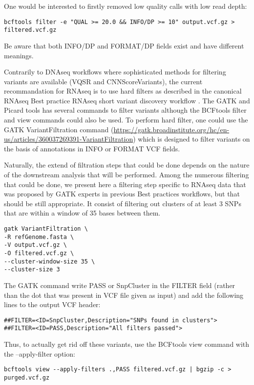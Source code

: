 One would be interested to firstly removed low quality calls with low read depth:

\begin{verbatim}
bcftools filter -e "QUAL >= 20.0 && INFO/DP >= 10" output.vcf.gz > filtered.vcf.gz
\end{verbatim}


Be aware that both INFO/DP and FORMAT/DP fields exist and have different meanings.


Contrarily to DNAseq workflows where sophisticated methods for filtering variants are available (VQSR and CNNScoreVariants), the current recommandation for RNAseq is to use hard filters as described in the canonical RNAseq Best practice RNAseq short variant discovery workflow \cite{GATK_RNAseq_variant_discovery}. The GATK and Picard tools has several commands to filter variants although the BCFtools filter and view commands could also be used. To perform hard filter, one could use the GATK VariantFiltration command  (\href{https://gatk.broadinstitute.org/hc/en-us/articles/360037269391-VariantFiltration}{https://gatk.broadinstitute.org/hc/en-us/articles/360037269391-VariantFiltration}) which is designed to filter variants on the basis of annotations in INFO or FORMAT VCF fields.

Naturally, the extend of filtration steps that could be done depends on the nature of the downstream analysis that will be performed. Among the numerous filtering that could be done, we present here a filtering step specific to RNAseq data that was proposed by GATK experts in previous Best practices workflows, but that should be still appropriate. It consist of filtering out clusters of at least 3 SNPs that are within a window of 35 bases between them.


\begin{verbatim}
gatk VariantFiltration \
-R refGenome.fasta \
-V output.vcf.gz \
-O filtered.vcf.gz \
--cluster-window-size 35 \
--cluster-size 3
\end{verbatim}

The GATK command write PASS or SnpCluster in the FILTER field (rather than the dot that was present in VCF file given as input) and add the following lines to the output VCF header:

\begin{verbatim}
##FILTER=<ID=SnpCluster,Description="SNPs found in clusters">
##FILTER=<ID=PASS,Description="All filters passed">
\end{verbatim}


Thus, to actually get rid off these variants, use the BCFtools view command with the --apply-filter option:
\begin{verbatim}
bcftools view --apply-filters .,PASS filtered.vcf.gz | bgzip -c > purged.vcf.gz
\end{verbatim}


